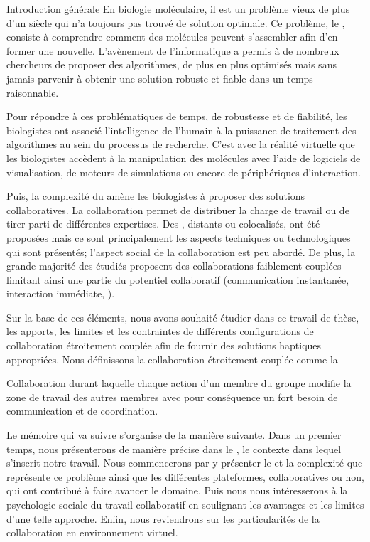 \documentclass[myfrancais,ngerman,english,french]{mythesis}
\begin{document}
	\begin{mychapter+}{Introduction générale}
		En biologie moléculaire, il est un problème vieux de plus d'un siècle qui n'a toujours pas trouvé de solution optimale.
		Ce problème, le , consiste à comprendre comment des molécules peuvent s'assembler afin d'en former une nouvelle.
		L'avènement de l'informatique a permis à de nombreux chercheurs de proposer des algorithmes, de plus en plus optimisés mais sans jamais parvenir à obtenir une solution robuste et fiable dans un temps raisonnable.

		Pour répondre à ces problématiques de temps, de robustesse et de fiabilité, les biologistes ont associé l'intelligence de l'humain à la puissance de traitement des algorithmes au sein du processus de recherche.
		C'est avec la réalité virtuelle que les biologistes accèdent à la manipulation des molécules avec l'aide de logiciels de visualisation, de moteurs de simulations ou encore de périphériques d'interaction.

		Puis, la complexité du  amène les biologistes à proposer des solutions collaboratives.
		La collaboration permet de distribuer la charge de travail ou de tirer parti de différentes expertises.
		Des , distants ou colocalisés, ont été proposées mais ce sont principalement les aspects techniques ou technologiques qui sont présentés; l'aspect social de la collaboration est peu abordé.
		De plus, la grande majorité des  étudiés proposent des collaborations faiblement couplées limitant ainsi une partie du potentiel collaboratif (communication instantanée, interaction immédiate, \myetc).

		Sur la base de ces éléments, nous avons souhaité étudier dans ce travail de thèse, les apports, les limites et les contraintes de différents configurations de collaboration étroitement couplée afin de fournir des solutions haptiques appropriées.
		Nous définissons la collaboration étroitement couplée comme la
		\begin{myquote}[francais]
			Collaboration durant laquelle chaque action d'un membre du groupe modifie la zone de travail des autres membres avec pour conséquence un fort besoin de communication et de coordination.
		\end{myquote}

		Le mémoire qui va suivre s'organise de la manière suivante.
		Dans un premier temps, nous présenterons de manière précise dans le , le contexte dans lequel s'inscrit notre travail.
		Nous commencerons par y présenter le  et la complexité que représente ce problème ainsi que les différentes plateformes, collaboratives ou non, qui ont contribué à faire avancer le domaine.
		Puis nous nous intéresserons à la psychologie sociale du travail collaboratif en soulignant les avantages et les limites d'une telle approche.
		Enfin, nous reviendrons sur les particularités de la collaboration en environnement virtuel.


\end{mychapter+}
\end{document}
